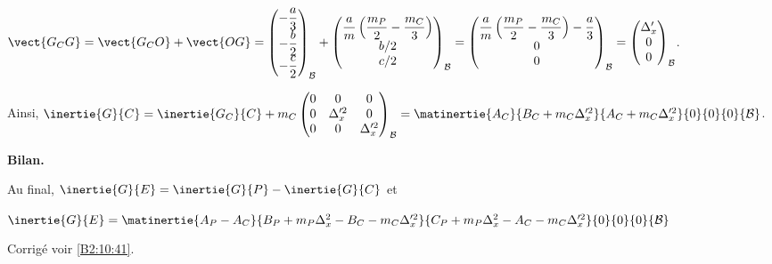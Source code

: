 $\vect{G_C G} = \vect{G_C O} + \vect{O G} = 
\begin{pmatrix}
-\dfrac{a}{3} \\
-\dfrac{b}{2} \\
-\dfrac{c}{2}
\end{pmatrix}_{\mathcal{B}} 
+
\begin{pmatrix}
\dfrac{a}{m} \left( \dfrac{m_P}{2} -  \dfrac{m_C}{3}\right) \\
b/2 \\
c/2
\end{pmatrix}_{\mathcal{B}}=
\begin{pmatrix}
\dfrac{a}{m} \left( \dfrac{m_P}{2} -  \dfrac{m_C}{3}\right) -\dfrac{a}{3}\\
0 \\
0
\end{pmatrix}_{\mathcal{B}}=
\begin{pmatrix}
\Delta_x'\\
0 \\
0
\end{pmatrix}_{\mathcal{B}}$.

Ainsi, 
$\inertie{G}{C} = \inertie{G_C}{C} + m_C\begin{pmatrix}
0 & 0 & 0\\
0 & \Delta_x'^2 & 0 \\
0 & 0 & \Delta_x'^2
\end{pmatrix}_{\mathcal{B}}
= \matinertie{A_C}{B_C+m_C\Delta_x'^2}{A_C+m_C\Delta_x'^2}{0}{0}{0}{\mathcal{B}}
$.

\textbf{Bilan.}

Au final, $\inertie{G}{E} = \inertie{G}{P} - \inertie{G}{C}$ et 

$\inertie{G}{E} = \matinertie{A_P-A_C}{B_P+m_P\Delta_x^2-B_C-m_C\Delta_x'^2}{C_P+m_P\Delta_x^2-A_C-m_C\Delta_x'^2}{0}{0}{0}{\mathcal{B}} $

%
%
%
\else
\fi


\ifprof
\else
\begin{flushright}
\footnotesize{Corrigé voir \ref{B2:10:41}.}
\end{flushright}%
\fi